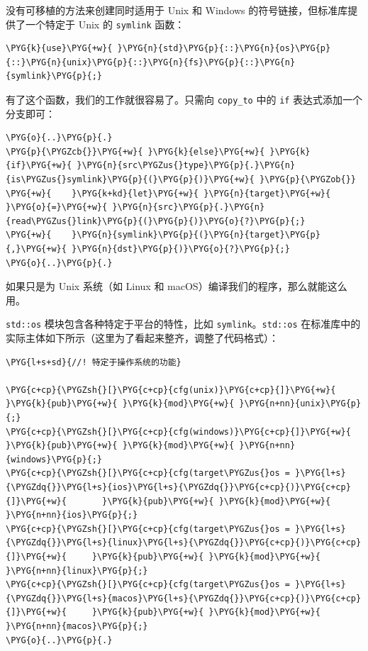 没有可移植的方法来创建同时适用于 Unix 和 Windows 的符号链接，但标准库提供了一个特定于 Unix 的 \texttt{symlink} 函数：

\begin{Verbatim}[commandchars=\\\{\},breaklines=true,breakanywhere=true,fontsize=\codefont,xleftmargin=17bp]
\PYG{k}{use}\PYG{+w}{ }\PYG{n}{std}\PYG{p}{::}\PYG{n}{os}\PYG{p}{::}\PYG{n}{unix}\PYG{p}{::}\PYG{n}{fs}\PYG{p}{::}\PYG{n}{symlink}\PYG{p}{;}
\end{Verbatim}

有了这个函数，我们的工作就很容易了。只需向 \texttt{copy\_to} 中的 \texttt{if} 表达式添加一个分支即可：

\begin{Verbatim}[commandchars=\\\{\},breaklines=true,breakanywhere=true,fontsize=\codefont,xleftmargin=17bp]
\PYG{o}{..}\PYG{p}{.}
\PYG{p}{\PYGZcb{}}\PYG{+w}{ }\PYG{k}{else}\PYG{+w}{ }\PYG{k}{if}\PYG{+w}{ }\PYG{n}{src\PYGZus{}type}\PYG{p}{.}\PYG{n}{is\PYGZus{}symlink}\PYG{p}{(}\PYG{p}{)}\PYG{+w}{ }\PYG{p}{\PYGZob{}}
\PYG{+w}{    }\PYG{k+kd}{let}\PYG{+w}{ }\PYG{n}{target}\PYG{+w}{ }\PYG{o}{=}\PYG{+w}{ }\PYG{n}{src}\PYG{p}{.}\PYG{n}{read\PYGZus{}link}\PYG{p}{(}\PYG{p}{)}\PYG{o}{?}\PYG{p}{;}
\PYG{+w}{    }\PYG{n}{symlink}\PYG{p}{(}\PYG{n}{target}\PYG{p}{,}\PYG{+w}{ }\PYG{n}{dst}\PYG{p}{)}\PYG{o}{?}\PYG{p}{;}
\PYG{o}{..}\PYG{p}{.}
\end{Verbatim}

如果只是为 Unix 系统（如 Linux 和 macOS）编译我们的程序，那么就能这么用。

\texttt{std::os} 模块包含各种特定于平台的特性，比如 \texttt{symlink}。\texttt{std::os} 在标准库中的实际主体如下所示（这里为了看起来整齐，调整了代码格式）：

\begin{Verbatim}[commandchars=\\\{\},breaklines=true,breakanywhere=true,fontsize=\codefont,xleftmargin=17bp]
\PYG{l+s+sd}{//! 特定于操作系统的功能}

\PYG{c+cp}{\PYGZsh{}[}\PYG{c+cp}{cfg(unix)}\PYG{c+cp}{]}\PYG{+w}{                    }\PYG{k}{pub}\PYG{+w}{ }\PYG{k}{mod}\PYG{+w}{ }\PYG{n+nn}{unix}\PYG{p}{;}
\PYG{c+cp}{\PYGZsh{}[}\PYG{c+cp}{cfg(windows)}\PYG{c+cp}{]}\PYG{+w}{                 }\PYG{k}{pub}\PYG{+w}{ }\PYG{k}{mod}\PYG{+w}{ }\PYG{n+nn}{windows}\PYG{p}{;}
\PYG{c+cp}{\PYGZsh{}[}\PYG{c+cp}{cfg(target\PYGZus{}os = }\PYG{l+s}{\PYGZdq{}}\PYG{l+s}{ios}\PYG{l+s}{\PYGZdq{}}\PYG{c+cp}{)}\PYG{c+cp}{]}\PYG{+w}{       }\PYG{k}{pub}\PYG{+w}{ }\PYG{k}{mod}\PYG{+w}{ }\PYG{n+nn}{ios}\PYG{p}{;}
\PYG{c+cp}{\PYGZsh{}[}\PYG{c+cp}{cfg(target\PYGZus{}os = }\PYG{l+s}{\PYGZdq{}}\PYG{l+s}{linux}\PYG{l+s}{\PYGZdq{}}\PYG{c+cp}{)}\PYG{c+cp}{]}\PYG{+w}{     }\PYG{k}{pub}\PYG{+w}{ }\PYG{k}{mod}\PYG{+w}{ }\PYG{n+nn}{linux}\PYG{p}{;}
\PYG{c+cp}{\PYGZsh{}[}\PYG{c+cp}{cfg(target\PYGZus{}os = }\PYG{l+s}{\PYGZdq{}}\PYG{l+s}{macos}\PYG{l+s}{\PYGZdq{}}\PYG{c+cp}{)}\PYG{c+cp}{]}\PYG{+w}{     }\PYG{k}{pub}\PYG{+w}{ }\PYG{k}{mod}\PYG{+w}{ }\PYG{n+nn}{macos}\PYG{p}{;}
\PYG{o}{..}\PYG{p}{.}
\end{Verbatim}

